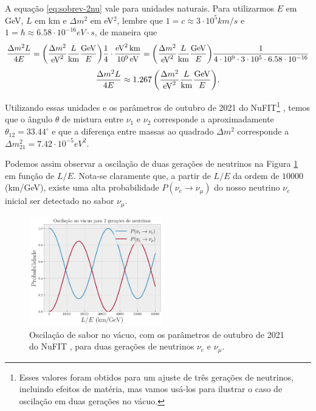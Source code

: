 \documentclass[12pt]{report}
\begin{document}
A equação \ref{eq:sobrev-2nu} vale para unidades naturais. Para utilizarmos $E$ em GeV, $L$ em km e $\Delta m^2$ em eV$^2$, lembre que $1 = c \approx 3 \cdot 10^5 \unit{km/s}$ e $1 = \hbar \approx 6.58 \cdot 10^{-16} \unit{eV \cdot s}$, de maneira que
$$
\frac{\Delta m^2 L}{4E} = \qty(\frac{\Delta m^2}{\text{eV}^2} \frac{L}{\text{km}} \frac{\text{GeV}}{E})
\frac{1}{4} \cdot \frac{\text{eV}^2 \, \text{km}}{10^9 \, \text{eV}} =
\qty(\frac{\Delta m^2}{\text{eV}^2} \frac{L}{\text{km}} \frac{\text{GeV}}{E})
\frac{1}{4 \cdot 10^9 \cdot 3 \cdot 10^5 \cdot 6.58 \cdot 10^{-16}}
$$
\begin{equation}
\frac{\Delta m^2 L}{4E} \approx 1.267 \, \qty(\frac{\Delta m^2}{\text{eV}^2} \frac{L}{\text{km}} \frac{\text{GeV}}{E}).
\end{equation}

Utilizando essas unidades e os parâmetros de outubro de 2021 do NuFIT\footnote{Esses valores foram obtidos para um ajuste de três gerações de neutrinos, incluindo efeitos de matéria, mas vamos usá-los para ilustrar o caso de oscilação em duas gerações no vácuo.} \cite{nufit}, temos que o ângulo $\theta$ de mistura entre $\nu_1$ e $\nu_2$ corresponde a aproximadamente $\theta_{12} = 33.44^\circ$ e que a diferença entre massas ao quadrado $\Delta m^2$ corresponde a $\Delta m_{21}^2 = 7.42 \cdot 10^{-5} \unit{eV^2}$.

Podemos assim observar a oscilação de duas gerações de neutrinos na Figura \ref{fig:2nu-vacuo} em função de $L/E$. Nota-se claramente que, a partir de $L / E$ da ordem de $10000$ (km/GeV), existe uma alta probabilidade $P(\nu_e \to \nu_\mu)$ do nosso neutrino $\nu_e$ inicial ser detectado no sabor $\nu_\mu$.

\begin{figure}[H]
\centering
\includegraphics[width=0.52\textwidth]{fig/2nu-vacuo.png}
\caption{Oscilação de sabor no vácuo, com os parâmetros de outubro de 2021 do NuFIT \cite{nufit}, para duas gerações de neutrinos $\nu_e$ e $\nu_\mu$.}
\label{fig:2nu-vacuo}
\end{figure}
\end{document}
